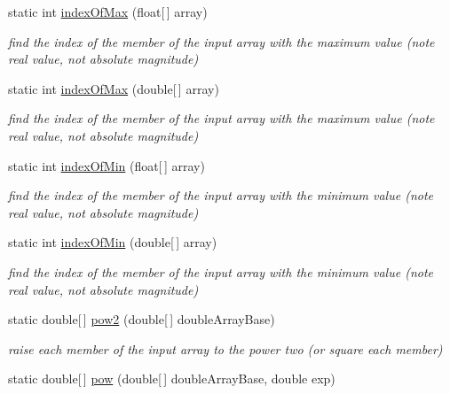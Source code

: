 \begin{DoxyCompactItemize}
static int \hyperlink{classuk_1_1ac_1_1dmu_1_1iesd_1_1cascade_1_1util_1_1_array_utils_aa3b594db771dd2cda7bc0aa64d283469}{index\-Of\-Max} (float\mbox{[}$\,$\mbox{]} array)
\begin{DoxyCompactList}\small\item\em find the index of the member of the input array with the maximum value (note real value, not absolute magnitude) \end{DoxyCompactList}\item 
static int \hyperlink{classuk_1_1ac_1_1dmu_1_1iesd_1_1cascade_1_1util_1_1_array_utils_acf5b8cf57c9f478273959a8000dec435}{index\-Of\-Max} (double\mbox{[}$\,$\mbox{]} array)
\begin{DoxyCompactList}\small\item\em find the index of the member of the input array with the maximum value (note real value, not absolute magnitude) \end{DoxyCompactList}\item 
static int \hyperlink{classuk_1_1ac_1_1dmu_1_1iesd_1_1cascade_1_1util_1_1_array_utils_accdab05dc514cfe9a8aa31d7011a11ee}{index\-Of\-Min} (float\mbox{[}$\,$\mbox{]} array)
\begin{DoxyCompactList}\small\item\em find the index of the member of the input array with the minimum value (note real value, not absolute magnitude) \end{DoxyCompactList}\item 
static int \hyperlink{classuk_1_1ac_1_1dmu_1_1iesd_1_1cascade_1_1util_1_1_array_utils_aa763bedd26369baedaa6920711c633fa}{index\-Of\-Min} (double\mbox{[}$\,$\mbox{]} array)
\begin{DoxyCompactList}\small\item\em find the index of the member of the input array with the minimum value (note real value, not absolute magnitude) \end{DoxyCompactList}\item 
static double\mbox{[}$\,$\mbox{]} \hyperlink{classuk_1_1ac_1_1dmu_1_1iesd_1_1cascade_1_1util_1_1_array_utils_ad06289acc2c7cf99071f1e1d240e4484}{pow2} (double\mbox{[}$\,$\mbox{]} double\-Array\-Base)
\begin{DoxyCompactList}\small\item\em raise each member of the input array to the power two (or square each member) \end{DoxyCompactList}\item 
static double\mbox{[}$\,$\mbox{]} \hyperlink{classuk_1_1ac_1_1dmu_1_1iesd_1_1cascade_1_1util_1_1_array_utils_aadc530cdb62125f8a1ebacbde8c00ce0}{pow} (double\mbox{[}$\,$\mbox{]} double\-Array\-Base, double exp)

\end{DoxyCompactItemize}
